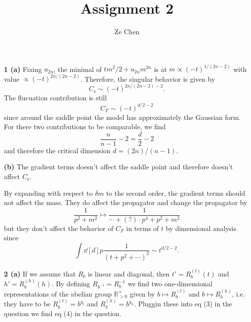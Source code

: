 \documentclass{article}
\title{Assignment 2}
\author{Ze Chen}
\makeatletter
\newcommand*{\shifttext}[1]{%
  \settowidth{\@tempdima}{#1}%
  \hspace{-\@tempdima}#1%
}
\newcommand{\plabel}[1]{%
\shifttext{\textbf{#1}\quad}%
}
\newcommand{\prule}{%
\begin{center}%
\hdashrule[0.5ex]{.99\linewidth}{1pt}{1pt 2.5pt}%
\end{center}%
}
\makeatother
\begin{document}
\maketitle

\plabel{1 (a)}%
Fixing $u_{2n}$, the minimal of $t m^2 / 2 + u_{2n} m^{2n}$ is at $m \propto (-t)^{1/(2n-2)}$ with value $\propto (-t)^{2n/(2n-2)}$.
Therefore, the singular behavior is given by
\[ C_{\text{s}} \sim (-t)^{2n/(2n-2) - 2}. \]
The flucuation contribution is still
\[ C_{F} \sim (-t)^{d/2-2} \]
since around the saddle point the model has approximately the Gaussian form.
For there two contributions to be comparable, we find
\[ \frac{n}{n-1} - 2 = \frac{d}{2} - 2 \]
and therefore the critical dimension $d = (2n)/(n-1)$.

\plabel{(b)}%
The gradient terms doesn't affect the saddle point and therefore doesn't affect $C_{\text{s}}$.
\par
By expanding with respect to $\delta m$ to the second order, the gradient terms should not affect the mass.
They do affect the propagator and change the propagator by
\[ \frac{1}{p^2 + m^2} \mapsto \frac{1}{\cdots + (?)\cdot p^4 + p^2 + m^2} \]
but they don't affect the behavior of $C_{F}$ in terms of $t$ by dimensional analysis since
\[ \int \dd[d]{p} \frac{1}{(t + p^2 + \cdots)^2} \sim t^{d/2-2}. \]

\prule

\plabel{2 (a)}%
If we assume that $R_b$ is linear and diagonal, then $t' = R_b^{(t)}(t)$ and $h' = R_b^{(h)}(h)$.
By defining $R_{b^{-1}} = R^{-1}_b$ we find two one-dimensional representations of the abelian group $\mathbb{R}^\times_{>0}$ given by $b\mapsto R_b^{(t)}$ and $b\mapsto R^{(h)}_b$, i.e. they have to be $R^{(t)}_b = b^{y_t}$ and $R^{(h)}_b = b^{y_h}$.
Pluggin these into eq (3) in the question we find eq (4) in the question.
\end{document}
